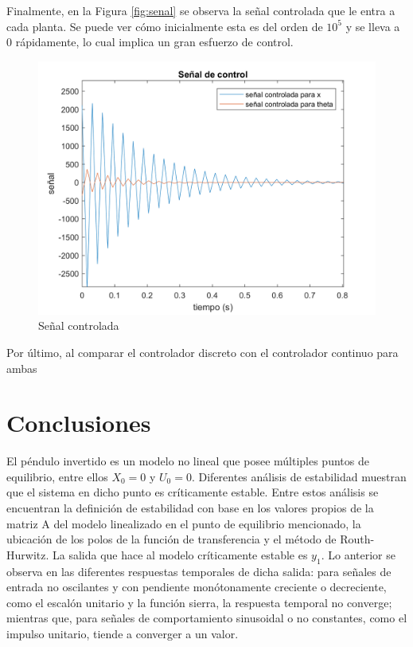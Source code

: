 \documentclass[journal]{IEEEtran}
\begin{document}
Finalmente, en la Figura \ref{fig:senal} se observa la señal controlada que le entra a cada planta. Se puede ver cómo inicialmente esta es del orden de $10^5$ y se lleva a 0 rápidamente, lo cual implica un gran esfuerzo de control.

\begin{figure}[!h]
\caption{Señal controlada\label{fig:senald}}
  \centering
\includegraphics[scale=0.18]{Bode/senalz.png}
\end{figure}

Por último, al comparar el controlador discreto con el controlador continuo para ambas 



\section{Conclusiones}
El péndulo invertido es un modelo no lineal que posee múltiples puntos de equilibrio, entre ellos $X_0=0$ y $U_0=0$. Diferentes análisis de estabilidad muestran que el sistema en dicho punto es críticamente estable. Entre estos análisis se encuentran la definición de estabilidad con base en los valores propios de la matriz A del modelo linealizado en el punto de equilibrio mencionado, la ubicación de los polos de la función de transferencia y el método de Routh-Hurwitz. La salida que hace al modelo críticamente estable es $y_1$. Lo anterior se observa en las diferentes respuestas temporales de dicha salida: para señales de entrada no oscilantes y con pendiente monótonamente creciente o decreciente, como el escalón unitario y la función sierra, la respuesta temporal no converge; mientras que, para señales de comportamiento sinusoidal o no constantes, como el impulso unitario, tiende a converger a un valor.\\
\end{document}
